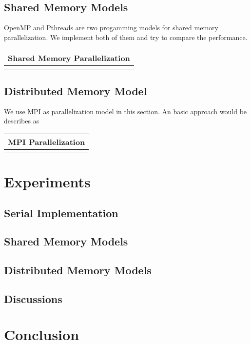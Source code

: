 \documentclass[11pt]{article}
\begin{document}
\subsection{Shared Memory Models}
OpenMP and Pthreads are two progamming models for shared memory parallelization. We implement both of them and try to 
compare the performance.

\begin{table}[htb]
  \centering
  \begin{tabular}{l}
    \hline
      Shared Memory Parallelization\\
    \hline
      \\
    \hline
  \end{tabular}
  \label{tab:shared_memory}
\end{table}

\subsection{Distributed Memory Model}
We use MPI \cite{mpi} as parallelization model in this section. An basic approach would be describes as

\begin{table}[htb]
  \centering
  \begin{tabular}{l}
    \hline
      MPI Parallelization\\
    \hline
      \\
    \hline
  \end{tabular}
  \label{tab:mpi_naive}
\end{table}

\section{Experiments}
\subsection{Serial Implementation}

\subsection{Shared Memory Models}

\subsection{Distributed Memory Models}

\subsection{Discussions}

\section{Conclusion}




\end{document}
